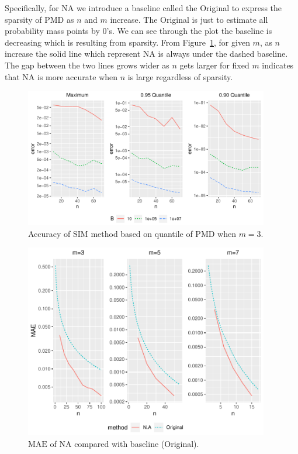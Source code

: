 \documentclass[12pt]{article}
\newcommand{\MAE}{{\textrm{MAE}}}
\newcommand{\PMD}{\textrm{PMD}}
\newcommand{\SIM}{{\textrm{SIM}}}
\newcommand{\NA}{{\textrm{NA}}}
\begin{document}
Specifically, for $\NA$ we introduce a baseline called the Original to express the sparsity of $\PMD$ as $n$ and $m$ increase. The Original is just to estimate all probability mass points by 0's. We can see through the plot the baseline is decreasing which is resulting from sparsity. From Figure~\ref{fig:accuracy.sim}, for given $m$, as $n$ increase the solid line which represent $\NA$ is always under the dashed baseline. The gap between the two lines grows wider as $n$ gets larger for fixed $m$ indicates that $\NA$ is more accurate when $n$ is large regardless of sparsity.

\begin{figure}%
\begin{center}
	\includegraphics[width=0.95\textwidth]{figures/simulation.pdf}
	\caption{Accuracy of $\SIM$ method based on quantile of $\PMD$ when $m=3$.}
	\label{fig:accuracy.sim}
\end{center}
\end{figure}

\begin{figure}%
\begin{center}
	\includegraphics[width=0.95\textwidth]{figures/mae.pdf}
	\caption{$\MAE$ of $\NA$ compared with baseline (Original).}
	\label{fig:mae.na}
\end{center}
\end{figure}
\end{document}
